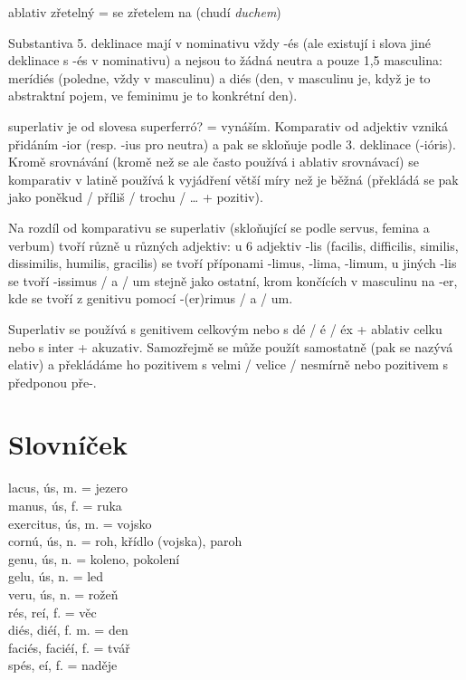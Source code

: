 \documentclass[12pt]{article}					%
\begin{document}
ablativ zřetelný = se zřetelem na (chudí \emph{duchem})

Substantiva 5. deklinace mají v nominativu vždy -és (ale existují i slova jiné deklinace s -és v nominativu) a nejsou to žádná neutra a pouze 1,5 masculina: merídiés (poledne, vždy v masculinu) a diés (den, v masculinu je, když je to abstraktní pojem, ve feminimu je to konkrétní den).

superlativ je od slovesa superferró? = vynáším. Komparativ od adjektiv vzniká přidáním -ior (resp. -ius pro neutra) a pak se skloňuje podle 3. deklinace (-ióris). Kromě srovnávání (kromě než se ale často používá i ablativ srovnávací) se komparativ v latině používá k vyjádření větší míry než je běžná (překládá se pak jako poněkud / příliš / trochu / … + pozitiv).

Na rozdíl od komparativu se superlativ (skloňující se podle servus, femina a verbum) tvoří různě u různých adjektiv: u 6 adjektiv -lis (facilis, difficilis, similis, dissimilis, humilis, gracilis) se tvoří příponami -limus, -lima, -limum, u jiných -lis se tvoří -issimus / a / um stejně jako ostatní, krom končících v masculinu na -er, kde se tvoří z genitivu pomocí -(er)rimus / a / um.

Superlativ se používá s genitivem celkovým nebo s dé / é / éx + ablativ celku nebo s inter + akuzativ. Samozřejmě se může použít samostatně (pak se nazývá elativ) a překládáme ho pozitivem s velmi / velice / nesmírně nebo pozitivem s předponou pře-.

    
\newpage
\section{Slovníček}
    lacus, ús, m. = jezero\\
    manus, ús, f. = ruka\\
    exercitus, ús, m. = vojsko\\
    cornú, ús, n. = roh, křídlo (vojska), paroh\\
    genu, ús, n. = koleno, pokolení\\
    gelu, ús, n. = led\\
    veru, ús, n. = rožeň\\
    rés, reí, f. = věc\\
    diés, diéí, f. m. = den\\
    faciés, faciéí, f. = tvář\\
    spés, eí, f. = naděje\\

    

    
\end{document}
